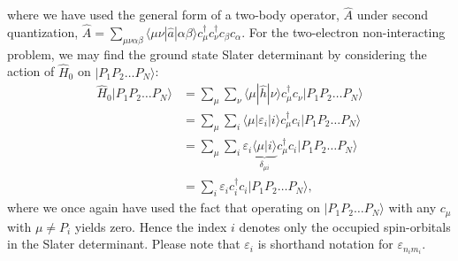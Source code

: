 \documentclass[a4paper]{article}
\newcommand{\nn}{\nonumber}
\newcommand{\slater}{|P_1P_2\dots P_N\rangle}
\newcommand{\cn}{c_\nu}
\newcommand{\cmd}{c_\mu^\dagger}
\newcommand{\cnd}{c_\nu^\dagger}
\newcommand{\ca}{c_\alpha}
\newcommand{\cb}{c_\beta}
\begin{document}
where we have used the general form of a two-body operator, $\hat{A}$ under second quantization, $\hat{A}=\sum_{\mu\nu\alpha\beta} \langle \mu\nu|\hat{a}|\alpha\beta\rangle \cmd\cnd\cb\ca$. For the two-electron non-interacting problem, we may find the ground state Slater determinant by considering the action of $\hat{H}_0$ on $\slater$:
\begin{align}
\hat{H}_0 \slater &= \sum_\mu\sum_\nu \langle \mu | \hat{h} | \nu \rangle \cmd \cn \slater \nn\\
                  &= \sum_\mu\sum_i \langle \mu | \varepsilon_i | i \rangle \cmd c_i \slater \nn\\
                  &= \sum_\mu\sum_i \varepsilon_i \underbrace{\langle \mu | i \rangle}_{\delta_{\mu i}} \cmd c_i \slater \nn\\
                  &= \sum_i \varepsilon_i c_i^\dagger c_i \slater,
\end{align}
where we once again have used the fact that operating on $\slater$ with any $c_\mu$ with $\mu\not=P_i$ yields zero. Hence the index $i$ denotes only the occupied spin-orbitals in the Slater determinant. Please note that $\varepsilon_i$ is shorthand notation for $\varepsilon_{n_i m_i}$. 
\end{document}
